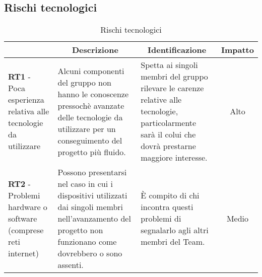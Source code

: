 \subsection{Rischi tecnologici} \label{subsection:rischi_tecnologici}
\begin{table}[H]
  \centering
  \renewcommand{\arraystretch}{1.8}
  \begin{tabular}{p{5.5cm}|p{5cm}|p{5cm}|c}
    \rowcolor[HTML]{1F85DE} 
    \multicolumn{1}{c}{\color[HTML]{FFFFFF}\textbf{Codice}}
    & \multicolumn{1}{c}{\color[HTML]{FFFFFF}\textbf{Descrizione}}
    & \multicolumn{1}{c}{\color[HTML]{FFFFFF}\textbf{Identificazione}}
    & \color[HTML]{FFFFFF}\textbf{Impatto}\\
    \hline
    \textbf{RT1} - Poca esperienza relativa alle tecnologie da utilizzare & Alcuni componenti del gruppo non hanno le conoscenze pressochè avanzate delle tecnologie da utilizzare per un conseguimento del progetto più fluido. & Spetta ai singoli membri del gruppo rilevare le carenze relative alle tecnologie, particolarmente sarà il \roleProjectManagerLow{} colui che dovrà prestarne maggiore interesse. & Alto\\
    \textbf{RT2} - Problemi hardware o software (comprese reti internet) & Possono presentarsi nel caso in cui i dispositivi utilizzati dai singoli membri nell'avanzamento del progetto non funzionano come dovrebbero o sono assenti. & È compito di chi incontra questi problemi di segnalarlo agli altri membri del Team. & Medio  \\
  \end{tabular}
  \caption{Rischi tecnologici}
\end{table}

